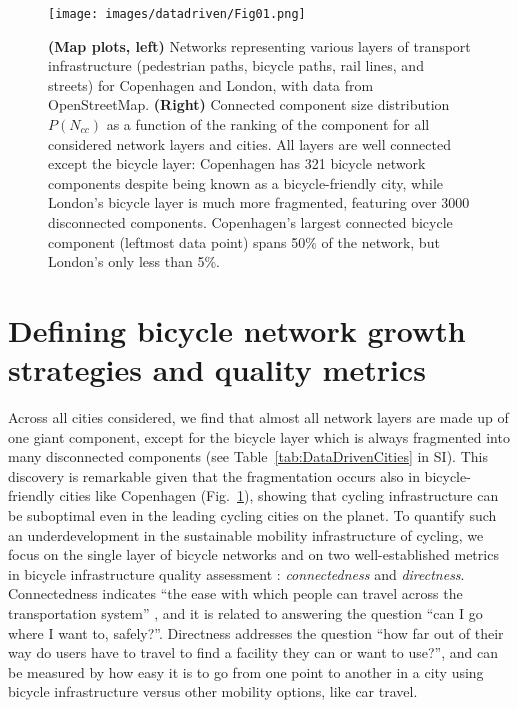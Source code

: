 \begin{figure}[htbp]
  \centering
  \texttt{[image: images/datadriven/Fig01.png]}
  \caption[Multimodal configuration]{\textbf{(Map plots, left)} Networks representing various layers of transport infrastructure (pedestrian paths, bicycle paths, rail lines, and streets) for Copenhagen and London, with data from OpenStreetMap. \textbf{(Right)} Connected component size distribution $P(N_{cc})$ as a function of the ranking of the component for all considered network layers and cities. All layers are well connected except the bicycle layer: Copenhagen has 321 bicycle network components despite being known as a bicycle-friendly city, while London's bicycle layer is much more fragmented, featuring over 3000 disconnected components. Copenhagen's largest connected bicycle component (leftmost data point) spans 50\% of the network, but London's only less than 5\%.}
  \label{fig:Multimodal}
\end{figure}

\section{Defining bicycle network growth strategies and quality metrics}
Across all cities considered, we find that almost all network layers are made up of one giant component, except for the bicycle layer which is always fragmented into many disconnected components (see Table~\ref{tab:DataDrivenCities} in SI). This discovery is remarkable given that the fragmentation occurs also in bicycle-friendly cities like Copenhagen (Fig.~\ref{fig:Multimodal}), showing that cycling infrastructure can be suboptimal even in the leading cycling cities on the planet. To quantify such an underdevelopment in the sustainable mobility infrastructure of cycling, we focus on the single layer of bicycle networks and on two well-established metrics in bicycle infrastructure quality assessment \cite{Krizek2005Discontinuities,movement2013Cycling,Dobrovolny2014Pedestrian,Twaddell2018Multimodal,Beck2019Space}: \textit{connectedness} and \textit{directness}. Connectedness indicates ``the ease with which people can travel across the transportation system'' \cite{Twaddell2018Multimodal}, and it is related to answering the question ``can I go where I want to, safely?''. Directness addresses the question ``how far out of their way do users have to travel to find a facility they can or want to use?'', and can be measured by how easy it is to go from one point to another in a city using bicycle infrastructure versus other mobility options, like car travel.

